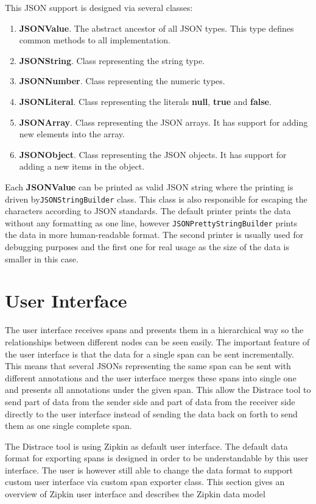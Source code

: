 This JSON support is designed via several classes:
\begin{enumerate}
	\item \textbf{JSONValue}. The abstract ancestor of all JSON types. This type defines common methods to all implementation.
	\item \textbf{JSONString}. Class representing the string type.
	\item \textbf{JSONNumber}. Class representing the numeric types.
	\item \textbf{JSONLiteral}. Class representing the literals \textbf{null}, \textbf{true} and \textbf{false}.
	\item \textbf{JSONArray}. Class representing the JSON arrays. It has support for adding new elements into the array.
	\item \textbf{JSONObject}. Class representing the JSON objects. It has support for adding a new items in the object.
\end{enumerate}

Each \textbf{JSONValue} can be printed as valid JSON string where the printing is driven by\texttt{JSONStringBuilder} class. This class is also responsible for escaping the characters according to JSON standards. The default printer prints the data without any formatting as one line, however \texttt{JSONPrettyStringBuilder} prints the data in more human-readable format. The second printer is usually used for debugging purposes and the first one for real usage as the size of the data is smaller in this case.

\section{User Interface}
\label{sec:zipkin_ui}
The user interface receives spans and presents them in a hierarchical way so the relationships between different nodes can be seen easily. The important feature of the user interface is that the data for a single span can be sent incrementally. This means that several JSONs representing the same span can be sent with different annotations and the user interface merges these spans into single one and presents all annotations under the given span. This allow the Distrace tool to send part of data from the sender side and part of data from the receiver side directly to the user interface instead of sending the data back on forth to send them as one single complete span.

The Distrace tool is using Zipkin as default user interface. The default data format for exporting spans is designed in order to be understandable by this user interface. The user is however still able to change the data format to support custom user interface via custom span exporter class. This section gives an overview of Zipkin user interface and describes the Zipkin data model


